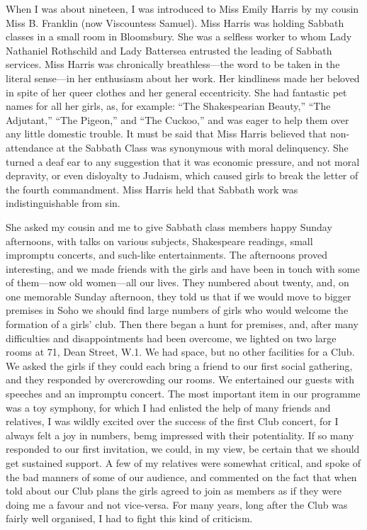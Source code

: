 When I was about nineteen, I was introduced to Miss
Emily Harris by my cousin Miss B. Franklin (now
Viscountess Samuel). Miss Harris was holding Sabbath
classes in a small room in Bloomsbury. She was a selfless
worker to whom Lady Nathaniel Rothschild and
Lady Battersea entrusted the leading of Sabbath services.
Miss Harris was chronically breathless—the word to be
taken in the literal sense—in her enthusiasm about her
work. Her kindliness made her beloved in spite of her
queer clothes and her general eccentricity. She had fantastic
pet names for all her girls, as, for example:
“The Shakespearian Beauty,” “The Adjutant,” “The
Pigeon,” and “The Cuckoo,” and was eager to help them
over any little domestic trouble. It must be said that
Miss Harris believed that non-attendance at the Sabbath
Class was synonymous with moral delinquency. She
turned a deaf ear to any suggestion that it was
economic pressure, and not moral depravity, or
even disloyalty to Judaism, which caused girls to
break the letter of the fourth commandment. Miss
Harris held that Sabbath work was indistinguishable from
sin.

She asked my cousin and me to give Sabbath class
members happy Sunday afternoons, with talks on various
subjects, Shakespeare readings, small impromptu concerts,
and such-like entertainments. The afternoons proved
interesting, and we made friends with the girls and have
been in touch with some of them—now old women—all
our lives. They numbered about twenty, and, on one
memorable Sunday afternoon, they told us that if we
would move to bigger premises in Soho we should find
large numbers of girls who would welcome the formation
of a girls’ club. Then there began a hunt for premises,
and, after many difficulties and disappointments had been
overcome, we lighted on two large rooms at 71, Dean
Street, W.1. We had space, but no other facilities for a
Club. We asked the girls if they could each bring a
friend to our first social gathering, and they responded by
overcrowding our rooms. We entertained our guests with
speeches and an impromptu concert. The most important
item in our programme was a toy symphony, for which
I had enlisted the help of many friends and relatives, I
was wildly excited over the success of the first Club concert,
for I always felt a joy in numbers, bemg impressed
with their potentiality. If so many responded to our first
invitation, we could, in my view, be certain that we should
get sustained support. A few of my relatives were somewhat
critical, and spoke of the bad manners of some of
our audience, and commented on the fact that when told
about our Club plans the girls agreed to join as members
as if they were doing me a favour and not vice-versa. For
many years, long after the Club was fairly well organised,
I had to fight this kind of criticism.

